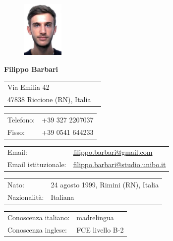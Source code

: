 \documentclass[curriculum-vitae]{subfiles}
\begin{document}
	\begin{figure}
		\includegraphics[width=0.18\textwidth]{fototessera}
	\end{figure}
	
	{\LARGE\bfseries Filippo Barbari} %
	\bigskip
	
	\begin{tabular}{ll}
		Via Emilia 42 & \\
		47838 Riccione (RN), Italia & \\
	\end{tabular}
	\medskip
	
	\begin{tabular}{ll}
		Telefono: & +39 327 2207037\\
		Fisso: & +39 0541 644233
	\end{tabular}
	\medskip
	
	\begin{tabular}{ll}
		Email: & \href{mailto:filippo.barbari@gmail.com}{filippo.barbari@gmail.com}\\
		Email istituzionale: & \href{mailto:filippo.barbari@studio.unibo.it}{filippo.barbari@studio.unibo.it}
	\end{tabular}
	\medskip
	
	\begin{tabular}{ll}
		Nato: & 24 agosto 1999, Rimini (RN), Italia\\ %
		Nazionalità: & Italiana %
	\end{tabular}
	\medskip
	
	\begin{tabular}{ll}
		Conoscenza italiano: & madrelingua\\
		Conoscenza inglese: & FCE livello B-2
	\end{tabular}
\end{document}
